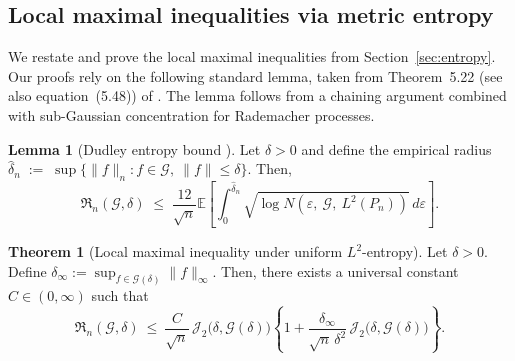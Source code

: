 \documentclass[11pt]{article}
\theoremstyle{plain}
\theoremstyle{definition} %
\newtheorem*{theorem*}{Theorem}    %
\newtheorem{lemma}{Lemma}
\begin{document}
 
\subsection{Local maximal inequalities via metric entropy}

\label{appendix::localmax2}

We restate and prove the local maximal inequalities from Section~\ref{sec:entropy}.
Our proofs rely on the following standard lemma, taken from Theorem~5.22 (see
also equation~(5.48)) of \citet{wainwright2019high}. The lemma follows from a
chaining argument combined with sub-Gaussian concentration for Rademacher
processes.


 


\begin{lemma}[Dudley entropy bound \citep{dudley1967sizes}]
\label{lemma:dudley}
Let $\delta>0$ and define the empirical radius $\hat{\delta}_n \;:=\; \sup\bigl\{\|f\|_n : f\in\mathcal G,\ \|f\|\le \delta\bigr\}.$
Then,
\[
\mathfrak{R}_n(\mathcal{G},\delta)
\;\le\;
\frac{12}{\sqrt{n}}
\mathbb{E} \left[ \int_{0}^{\hat{\delta}_n}
\sqrt{\log N\left(\varepsilon,\ \mathcal G,\ L^2(P_n)\right)}\, d\varepsilon \right].
\]
\end{lemma}






\begin{theorem*}[Local maximal inequality under
uniform $L^2$-entropy]
Let $\delta >0$. Define $\delta_{\infty}
:= \sup_{f \in \mathcal{G}(\delta)}\|f\|_{\infty}.$
Then, there exists a universal constant $C \in (0,\infty)$ such that
\[
\mathfrak{R}_n(\mathcal{G},\delta)
\ \le\
\frac{C}{\sqrt{n}}\,\mathcal{J}_2\bigl(\delta,\mathcal{G}(\delta)\bigr)
\left\{
1
+
\frac{\delta_{\infty}}{\sqrt{n}\,\delta^2}\,
\mathcal{J}_2\bigl(\delta,\mathcal{G}(\delta)\bigr)
\right\}.
\]
\end{theorem*}
\end{document}
